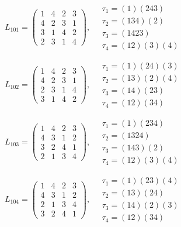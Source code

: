 $L_{101} = \begin{pmatrix} 1 & 4 & 2 & 3 \\ 4 & 2 & 3 & 1 \\ 3 & 1 & 4 & 2 \\ 2 & 3 & 1 & 4 \end{pmatrix}, \quad \begin{matrix} \tau_{1} = (1)(2 4 3) \\ \tau_{2} = (1 3 4)(2) \\ \tau_{3} = (1 4 2 3) \\ \tau_{4} = (1 2)(3)(4) \end{matrix}$

$L_{102} = \begin{pmatrix} 1 & 4 & 2 & 3 \\ 4 & 2 & 3 & 1 \\ 2 & 3 & 1 & 4 \\ 3 & 1 & 4 & 2 \end{pmatrix}, \quad \begin{matrix} \tau_{1} = (1)(2 4)(3) \\ \tau_{2} = (1 3)(2)(4) \\ \tau_{3} = (1 4)(2 3) \\ \tau_{4} = (1 2)(3 4) \end{matrix}$

$L_{103} = \begin{pmatrix} 1 & 4 & 2 & 3 \\ 4 & 3 & 1 & 2 \\ 3 & 2 & 4 & 1 \\ 2 & 1 & 3 & 4 \end{pmatrix}, \quad \begin{matrix} \tau_{1} = (1)(2 3 4) \\ \tau_{2} = (1 3 2 4) \\ \tau_{3} = (1 4 3)(2) \\ \tau_{4} = (1 2)(3)(4) \end{matrix}$

$L_{104} = \begin{pmatrix} 1 & 4 & 2 & 3 \\ 4 & 3 & 1 & 2 \\ 2 & 1 & 3 & 4 \\ 3 & 2 & 4 & 1 \end{pmatrix}, \quad \begin{matrix} \tau_{1} = (1)(2 3)(4) \\ \tau_{2} = (1 3)(2 4) \\ \tau_{3} = (1 4)(2)(3) \\ \tau_{4} = (1 2)(3 4) \end{matrix}$

